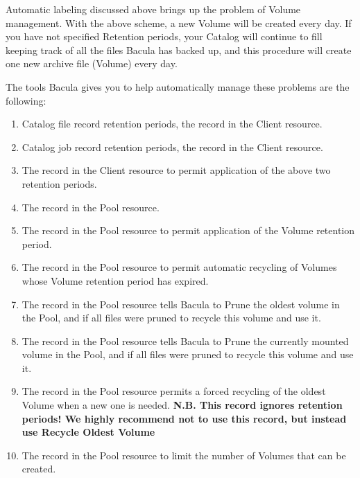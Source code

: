 Automatic labeling discussed above brings up the problem of Volume management.
With the above scheme, a new Volume will be created every day. If you have not
specified Retention periods, your Catalog will continue to fill keeping track
of all the files Bacula has backed up, and this procedure will create one new
archive file (Volume) every day. 

The tools Bacula gives you to help automatically manage these problems are the
following: 

\begin{enumerate}
\item Catalog file record retention periods, the  
     record in the Client
   resource.  
\item Catalog job record retention periods, the  
     record in the Client
   resource.  
\item The 
    record in the Client resource
   to permit  application of the above two retention periods.  
\item The 
    record in the Pool
   resource.  
\item The 
    record in the Pool
   resource to permit  application of the Volume retention period.  
\item The 
    record in the Pool resource
   to permit  automatic recycling of Volumes whose Volume retention period has 
   expired.  
\item The 
    record in the
   Pool resource tells Bacula  to Prune the oldest volume in the Pool, and if all
   files  were pruned to recycle this volume and use it.  
\item The 
    record in
   the Pool resource tells Bacula  to Prune the currently mounted volume in the
   Pool, and if all files  were pruned to recycle this volume and use it.  
\item The 
    record in the
   Pool resource  permits a forced recycling of the oldest Volume when a new one
   is  needed.  {\bf N.B. This record ignores retention periods! We highly
   recommend  not to use this record, but instead use Recycle Oldest Volume}  
\item The 
    record in the Pool
   resource to limit  the number of Volumes that can be created. 
\end{enumerate}

